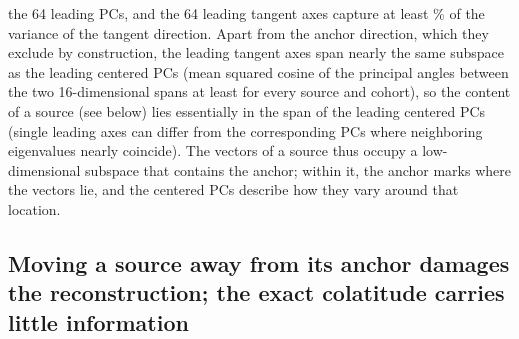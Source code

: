 \documentclass[10pt,letterpaper]{article}
\begin{document}
the 64 leading PCs, and the 64 leading tangent axes capture at least \TangentSixtyFourMin\% of
the variance of the tangent direction. Apart from the anchor direction, which they exclude by
construction, the leading tangent axes span nearly the same subspace as the leading centered PCs
(mean squared cosine of the principal angles between the two 16-dimensional spans at least
\TangentPCAlignMin{} for every source and cohort), so the content of a source (see below) lies
essentially in the span of the leading centered PCs (single leading axes can differ from the
corresponding PCs where neighboring eigenvalues nearly coincide). The vectors of a source thus occupy a low-dimensional
subspace that contains the anchor; within it, the anchor marks where the vectors lie, and the
centered PCs describe how they vary around that location.

\subsection*{Moving a source away from its anchor damages the reconstruction; the exact colatitude carries little information}\label{sec:res-necessity}
\end{document}

